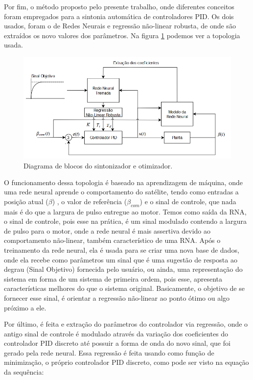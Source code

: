 Por fim, o método proposto pelo presente trabalho, onde diferentes conceitos foram empregados para a sintonia automática de controladores PID. Os dois usados, foram o de Redes Neurais e regressão não-linear robusta, de onde são extraídos os novo valores dos parâmetros. Na figura \ref{fig:neural_regression} podemos ver a topologia usada.

\begin{figure}[H]
  \caption{Diagrama de blocos do sintonizador e otimizador.}
  \begin{center}
      \includegraphics[scale=.65]{metodologia/img/neural_regression}
  \end{center}
  \label{fig:neural_regression}
\end{figure}

O funcionamento dessa topologia é baseado na aprendizagem de máquina, onde uma rede neural aprende o comportamento do satélite, tendo como entradas a posição atual ($\beta$) , o valor de referência ($\beta_{com}$) e o sinal de controle, que nada mais é do que a largura de pulso entregue ao motor. Temos como saída da RNA, o sinal de controle, pois esse na prática, é um sinal modulado contendo a largura de pulso para o motor, onde a rede neural é mais assertiva devido ao comportamento não-linear, também característico de uma RNA. Após o treinamento da rede neural, ela é usada para se criar uma nova base de dados, onde ela recebe como parâmetros um sinal que é uma sugestão de resposta ao degrau (Sinal Objetivo) fornecida pelo usuário, ou ainda, uma representação do sistema em forma de um sistema de primeira ordem, pois esse, apresenta características melhores do que o sistema original. Basicamente, o objetivo de se fornecer esse sinal, é orientar a regressão não-linear ao ponto ótimo ou algo próximo a ele.

Por último, é feita e extração do parâmetros do controlador via regressão, onde o antigo sinal de controle é modulado através da variação dos coeficientes do controlador PID discreto até possuir a forma de onda do novo sinal, que foi gerado pela rede neural. Essa regressão é feita usando como função de minimização, o próprio controlador PID discreto, como pode ser visto na equação da sequência:

